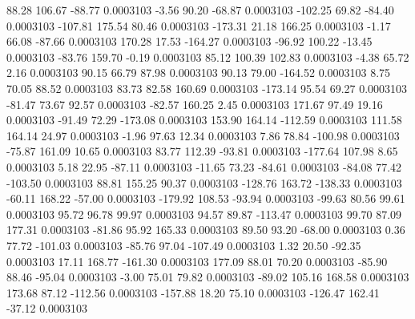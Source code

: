        88.28      106.67      -88.77     0.0003103
       -3.56       90.20      -68.87     0.0003103
     -102.25       69.82      -84.40     0.0003103
     -107.81      175.54       80.46     0.0003103
     -173.31       21.18      166.25     0.0003103
       -1.17       66.08      -87.66     0.0003103
      170.28       17.53     -164.27     0.0003103
      -96.92      100.22      -13.45     0.0003103
      -83.76      159.70       -0.19     0.0003103
       85.12      100.39      102.83     0.0003103
       -4.38       65.72        2.16     0.0003103
       90.15       66.79       87.98     0.0003103
       90.13       79.00     -164.52     0.0003103
        8.75       70.05       88.52     0.0003103
       83.73       82.58      160.69     0.0003103
     -173.14       95.54       69.27     0.0003103
      -81.47       73.67       92.57     0.0003103
      -82.57      160.25        2.45     0.0003103
      171.67       97.49       19.16     0.0003103
      -91.49       72.29     -173.08     0.0003103
      153.90      164.14     -112.59     0.0003103
      111.58      164.14       24.97     0.0003103
       -1.96       97.63       12.34     0.0003103
        7.86       78.84     -100.98     0.0003103
      -75.87      161.09       10.65     0.0003103
       83.77      112.39      -93.81     0.0003103
     -177.64      107.98        8.65     0.0003103
        5.18       22.95      -87.11     0.0003103
      -11.65       73.23      -84.61     0.0003103
      -84.08       77.42     -103.50     0.0003103
       88.81      155.25       90.37     0.0003103
     -128.76      163.72     -138.33     0.0003103
      -60.11      168.22      -57.00     0.0003103
     -179.92      108.53      -93.94     0.0003103
      -99.63       80.56       99.61     0.0003103
       95.72       96.78       99.97     0.0003103
       94.57       89.87     -113.47     0.0003103
       99.70       87.09      177.31     0.0003103
      -81.86       95.92      165.33     0.0003103
       89.50       93.20      -68.00     0.0003103
        0.36       77.72     -101.03     0.0003103
      -85.76       97.04     -107.49     0.0003103
        1.32       20.50      -92.35     0.0003103
       17.11      168.77     -161.30     0.0003103
      177.09       88.01       70.20     0.0003103
      -85.90       88.46      -95.04     0.0003103
       -3.00       75.01       79.82     0.0003103
      -89.02      105.16      168.58     0.0003103
      173.68       87.12     -112.56     0.0003103
     -157.88       18.20       75.10     0.0003103
     -126.47      162.41      -37.12     0.0003103
